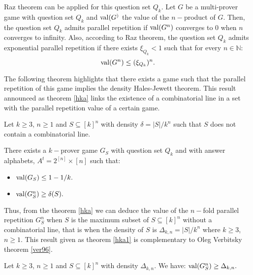  
Raz theorem can be applied for this question set $Q_k$. Let $G$ be a multi-prover game with question set $Q_k$ and $\mathrm{val} (G^)$ the value of the $n-$product of $G.$  Then, the question set $Q_k$ admits parallel repetition if $ \mathrm{val} (G^n)$ converges to $0$ when $n$ converges to infinity. Also, according to Raz theorem, the question set $Q_k$  admits exponential parallel repetition if there exists $\xi_{Q_k} < 1$ such that for every $n \in \mathbb{N}$: $$\mathrm{val} (G^n) \leq (\xi_{Q_k})^n.$$


The following theorem highlights that there exists a game such that the parallel repetition of this game  implies the density Hales-Jewett theorem. This result announced as theorem \eqref{hka} links the existence of a combinatorial line in a set with the parallel repetition value of a certain game.
 
 \begin{thm} Let $k\geq 3$, $n\geq 1$ and $S\subseteq [k]^n$ with density $\delta=|S|/k^n$ such that $S$ does not contain a combinatorial line.	
 
There exists a $k-$prover game $G_S$ with question set $Q_k$ and with answer alphabets,
$A^t = 2^{[n]} \times [n]$ such that:
\begin{itemize}
\item $\mathrm{val} (G_S) \leq 1-1/k.$ 	\item $\mathrm{val} (G_S^n) \geq \delta(S).$
\end{itemize} \label{hka}
 	\end{thm}

Thus, from the theorem \eqref{hka} we can deduce the value of the $n-$fold parallel repetition $G_S^n$ when $S$ is the maximum subset of  $S\subseteq [k]^n$ without a combinatorial line, that is when the density of $S$ is $\Delta_{k,n}= |S|/k^n$ where $k\geq 3$, $n\geq 1$. This result given as theorem \eqref{hka1} is complementary to  Oleg Verbitsky theorem \eqref{ver96}.

 \begin{thm} Let $k\geq 3$, $n\geq 1$ and $S\subseteq [k]^n$ with density $\Delta_{k,n}$. We have: 	
 $\mathrm{val} (G_S^n) \geq \Delta_{k,n}.$  \label{hka1}
 	\end{thm} 

